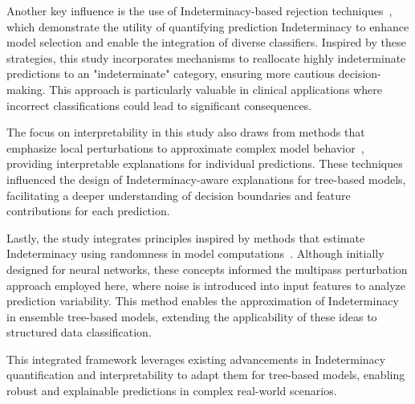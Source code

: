 Another key influence is the use of Indeterminacy-based rejection techniques~\cite{electronics11030396}, which demonstrate the utility of quantifying prediction Indeterminacy to enhance model selection and enable the integration of diverse classifiers. Inspired by these strategies, this study incorporates mechanisms to reallocate highly indeterminate predictions to an "indeterminate" category, ensuring more cautious decision-making. This approach is particularly valuable in clinical applications where incorrect classifications could lead to significant consequences.

The focus on interpretability in this study also draws from methods that emphasize local perturbations to approximate complex model behavior~\cite{perturbations}, providing interpretable explanations for individual predictions. These techniques influenced the design of Indeterminacy-aware explanations for tree-based models, facilitating a deeper understanding of decision boundaries and feature contributions for each prediction.

Lastly, the study integrates principles inspired by methods that estimate Indeterminacy using randomness in model computations~\cite{pmlr-v48-gal16}. Although initially designed for neural networks, these concepts informed the multipass perturbation approach employed here, where noise is introduced into input features to analyze prediction variability. This method enables the approximation of Indeterminacy in ensemble tree-based models, extending the applicability of these ideas to structured data classification.

This integrated framework leverages existing advancements in Indeterminacy quantification and interpretability to adapt them for tree-based models, enabling robust and explainable predictions in complex real-world scenarios.